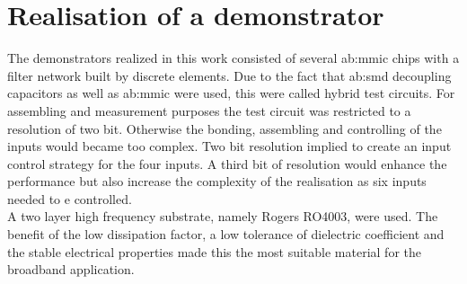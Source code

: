 \chapter{Realisation of a demonstrator}
The demonstrators realized in this work consisted of several \gls{ab:mmic} chips with a filter network built by discrete elements.
Due to the fact that \gls{ab:smd} decoupling capacitors as well as \gls{ab:mmic} were used, this were called hybrid test circuits.
For assembling and measurement purposes the test circuit was restricted to a resolution of two bit.
Otherwise the bonding, assembling and controlling of the inputs would became too complex.
Two bit resolution implied to create an input control strategy for the four inputs.
A third bit of resolution would enhance the performance but also increase the complexity of the realisation as six inputs needed to e controlled.
\\
A two layer high frequency substrate, namely Rogers RO4003, were used.
The benefit of the low dissipation factor, a low tolerance of dielectric coefficient and the stable electrical properties made this the most suitable material for the broadband application. %

